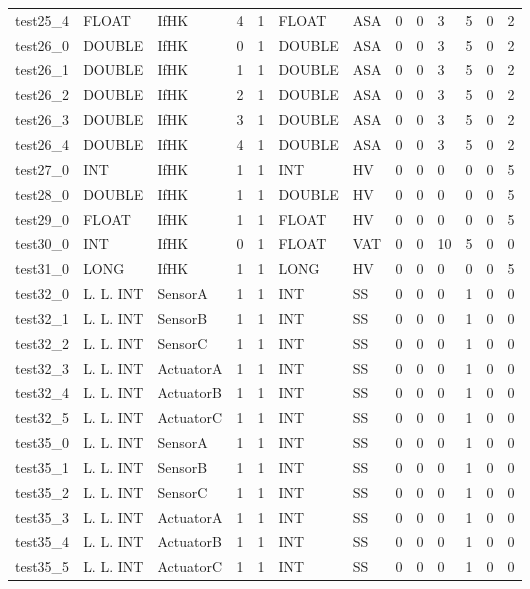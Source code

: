 \begin{longtable}{|l|l|l|p{0.5cm}|p{0.5cm}|l|p{0.5cm}|p{0.5cm}|p{0.5cm}|l|l|p{0.5cm}|l|}
test25\_4 & FLOAT & IfHK & 4 & 1 & FLOAT & ASA & 0 & 0 & 3 & 5 & 0 & 2 \\
test26\_0 & DOUBLE & IfHK & 0 & 1 & DOUBLE & ASA & 0 & 0 & 3 & 5 & 0 & 2 \\
test26\_1 & DOUBLE & IfHK & 1 & 1 & DOUBLE & ASA & 0 & 0 & 3 & 5 & 0 & 2 \\
test26\_2 & DOUBLE & IfHK & 2 & 1 & DOUBLE & ASA & 0 & 0 & 3 & 5 & 0 & 2 \\
test26\_3 & DOUBLE & IfHK & 3 & 1 & DOUBLE & ASA & 0 & 0 & 3 & 5 & 0 & 2 \\
test26\_4 & DOUBLE & IfHK & 4 & 1 & DOUBLE & ASA & 0 & 0 & 3 & 5 & 0 & 2 \\
test27\_0 & INT & IfHK & 1 & 1 & INT & HV & 0 & 0 & 0 & 0 & 0 & 5 \\
test28\_0 & DOUBLE & IfHK & 1 & 1 & DOUBLE & HV & 0 & 0 & 0 & 0 & 0 & 5 \\
test29\_0 & FLOAT & IfHK & 1 & 1 & FLOAT & HV & 0 & 0 & 0 & 0 & 0 & 5 \\
test30\_0 & INT & IfHK & 0 & 1 & FLOAT & VAT & 0 & 0 & 10 & 5 & 0 & 0 \\
test31\_0 & LONG & IfHK & 1 & 1 & LONG & HV & 0 & 0 & 0 & 0 & 0 & 5 \\
test32\_0 & L. L. INT & SensorA & 1 & 1 & INT & SS & 0 & 0 & 0 & 1 & 0 & 0 \\
test32\_1 & L. L. INT & SensorB & 1 & 1 & INT & SS & 0 & 0 & 0 & 1 & 0 & 0 \\
test32\_2 & L. L. INT & SensorC & 1 & 1 & INT & SS & 0 & 0 & 0 & 1 & 0 & 0 \\
test32\_3 & L. L. INT & ActuatorA & 1 & 1 & INT & SS & 0 & 0 & 0 & 1 & 0 & 0 \\
test32\_4 & L. L. INT & ActuatorB & 1 & 1 & INT & SS & 0 & 0 & 0 & 1 & 0 & 0 \\
test32\_5 & L. L. INT & ActuatorC & 1 & 1 & INT & SS & 0 & 0 & 0 & 1 & 0 & 0 \\
test35\_0 & L. L. INT & SensorA & 1 & 1 & INT & SS & 0 & 0 & 0 & 1 & 0 & 0 \\
test35\_1 & L. L. INT & SensorB & 1 & 1 & INT & SS & 0 & 0 & 0 & 1 & 0 & 0 \\
test35\_2 & L. L. INT & SensorC & 1 & 1 & INT & SS & 0 & 0 & 0 & 1 & 0 & 0 \\
test35\_3 & L. L. INT & ActuatorA & 1 & 1 & INT & SS & 0 & 0 & 0 & 1 & 0 & 0 \\
test35\_4 & L. L. INT & ActuatorB & 1 & 1 & INT & SS & 0 & 0 & 0 & 1 & 0 & 0 \\
test35\_5 & L. L. INT & ActuatorC & 1 & 1 & INT & SS & 0 & 0 & 0 & 1 & 0 & 0 \\

\end{longtable}
